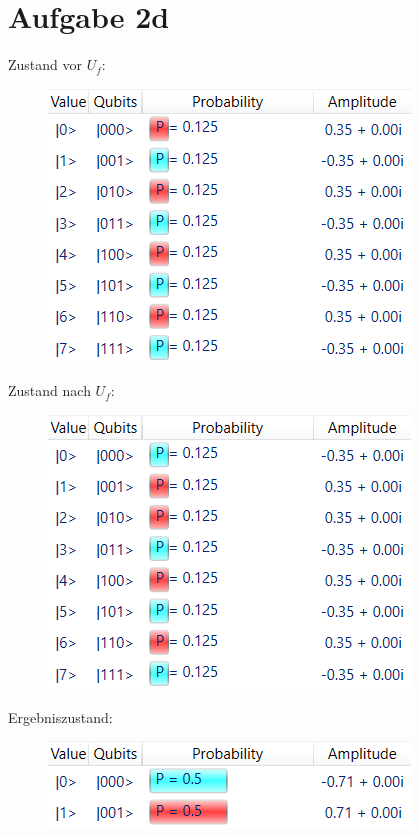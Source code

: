 \documentclass[fleqn,compress,utf8,aspectratio=169,t]{beamer}
\begin{document}
\section{Aufgabe 2d}

\begin{frame}{}
\begin{minipage}[t]{.333\textwidth}
\centering
Zustand vor $U_f$:
\begin{figure}
	\includegraphics[width=.9\textwidth]{images/2d-vor-UF.png}
\end{figure}
\end{minipage}%
\begin{minipage}[t]{.333\textwidth}
\centering
Zustand nach $U_f$:
\begin{figure}
	\includegraphics[width=.9\textwidth]{images/2d-nach-UF.png}
\end{figure}
\end{minipage}%
\begin{minipage}[t]{.333\textwidth}
\centering
Ergebniszustand:
\begin{figure}
	\includegraphics[width=.9\textwidth]{images/2d-nach-D2.png}
\end{figure}
\end{minipage}%
\end{frame}
\end{document}
